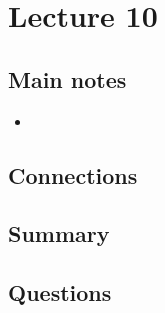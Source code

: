 \section{Lecture 10}

\subsection{Main notes}


\begin{itemize}
	\item
\end{itemize}


\subsection{Connections}


\subsection{Summary}


\subsection{Questions}
